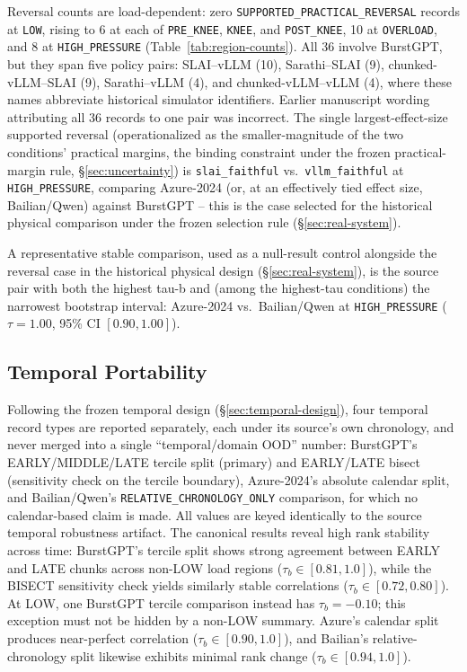 Reversal counts are load-dependent: zero \texttt{SUPPORTED\_PRACTICAL\_REVERSAL}
records at \texttt{LOW}, rising to 6 at each of \texttt{PRE\_KNEE},
\texttt{KNEE}, and \texttt{POST\_KNEE}, 10 at \texttt{OVERLOAD}, and 8 at
\texttt{HIGH\_PRESSURE} (Table~\ref{tab:region-counts}). All 36 involve BurstGPT, but they span five policy pairs: SLAI--vLLM
(10), Sarathi--SLAI (9), chunked-vLLM--SLAI (9), Sarathi--vLLM (4), and
chunked-vLLM--vLLM (4), where these names abbreviate historical simulator
identifiers. Earlier manuscript wording attributing all 36 records to one
pair was incorrect. The single largest-effect-size supported reversal (operationalized
as the smaller-magnitude of the two conditions' practical margins, the
binding constraint under the frozen practical-margin rule,
\S\ref{sec:uncertainty}) is \texttt{slai\_faithful} vs.\
\texttt{vllm\_faithful} at \texttt{HIGH\_PRESSURE}, comparing Azure-2024
(or, at an effectively tied effect size, Bailian/Qwen) against BurstGPT --
this is the case selected for the historical physical comparison under the frozen
selection rule (\S\ref{sec:real-system}).

A representative stable comparison, used as a null-result control alongside
the reversal case in the historical physical design
(\S\ref{sec:real-system}), is the source pair with both the highest tau-b
and (among the highest-tau conditions) the narrowest bootstrap interval:
Azure-2024 vs.\ Bailian/Qwen at \texttt{HIGH\_PRESSURE} ($\tau = 1.00$,
95\% CI $[0.90, 1.00]$).

\subsection{Temporal Portability}
\label{sec:temporal}

Following the frozen temporal design (\S\ref{sec:temporal-design}), four
temporal record types are reported separately, each under its source's own
chronology, and never merged into a single ``temporal/domain OOD'' number:
BurstGPT's EARLY/MIDDLE/LATE tercile split (primary) and EARLY/LATE bisect
(sensitivity check on the tercile boundary), Azure-2024's absolute calendar
split, and Bailian/Qwen's \texttt{RELATIVE\_CHRONOLOGY\_ONLY} comparison,
for which no calendar-based claim is made. All values are keyed identically
to the source temporal robustness artifact. The canonical results reveal high rank stability across time: BurstGPT's tercile split shows strong agreement between EARLY and LATE chunks across non-LOW load regions ($\tau_b \in [0.81, 1.0]$), while the BISECT sensitivity check yields similarly stable correlations ($\tau_b \in [0.72, 0.80]$). At LOW, one BurstGPT tercile comparison instead has $\tau_b=-0.10$; this exception must not be hidden by a non-LOW summary. Azure's calendar split produces near-perfect correlation ($\tau_b \in [0.90, 1.0]$), and Bailian's relative-chronology split likewise exhibits minimal rank change ($\tau_b \in [0.94, 1.0]$).

